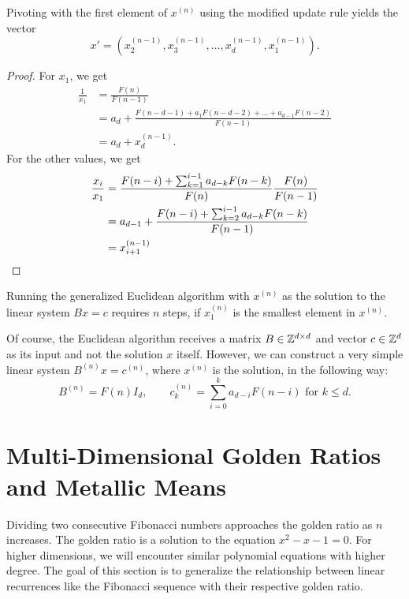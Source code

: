 \begin{lemma}
  Pivoting with the first element of $x^{(n)}$ using the modified update rule yields the vector
  \[
    x' = (x^{(n-1)}_2, x^{(n-1)}_3, \dots, x^{(n-1)}_d, x^{(n-1)}_1).
  \]
\end{lemma}

\begin{proof}
  For $x_1$, we get
  \[
    \begin{aligned}
      \frac{1}{x_1}
      & = \frac{F(n)}{F(n - 1)} \\
      & = a_d + \frac{F(n - d - 1) + a_1 F(n - d - 2) + \dots + a_{d-1} F(n - 2)}{F(n - 1)} \\
      & = a_d + x^{(n-1)}_d.
    \end{aligned}
  \]
  For the other values, we get
  \begin{align*}
    \frac{x_i}{x_1}
    & = \frac{F(n - i) + \sum_{k=1}^{i-1} a_{d-k} F(n - k)}{F(n)} \frac{F(n)}{F(n - 1)} \\
    & = a_{d-1} + \frac{F(n - i) + \sum_{k=2}^{i-1} a_{d-k} F(n - k)}{F(n-1)} \\
    & = x^{(n-1)}_{i+1} \qedhere
  \end{align*}
\end{proof}

\begin{corollary}
  Running the generalized Euclidean algorithm with $x^{(n)}$ as the solution to
  the linear system $B x = c$ requires $n$ steps, if $x^{(n)}_1$ is the
  smallest element in $x^{(n)}$.
\end{corollary}

Of course, the Euclidean algorithm receives a matrix $B \in {\mathbb Z}^{d \times d}$
and vector $c \in {\mathbb Z}^d$ as its input and not the solution $x$ itself.
However, we can construct a very simple linear system $B^{(n)} x = c^{(n)}$,
where $x^{(n)}$ is the solution, in the following way:
\[
  B^{(n)} = F(n) I_d, \qquad c^{(n)}_k = \sum_{i=0}^k a_{d-i} F(n - i) \text{ for } k ≤ d.
\]

\section{Multi-Dimensional Golden Ratios and Metallic Means}


%
%


Dividing two consecutive Fibonacci numbers approaches the golden ratio as $n$ increases.
The golden ratio is a solution to the equation $x^2 - x - 1 = 0$.
For higher dimensions, we will encounter similar polynomial equations with higher degree.
The goal of this section is to generalize the relationship between linear
recurrences like the Fibonacci sequence with their respective golden ratio.

